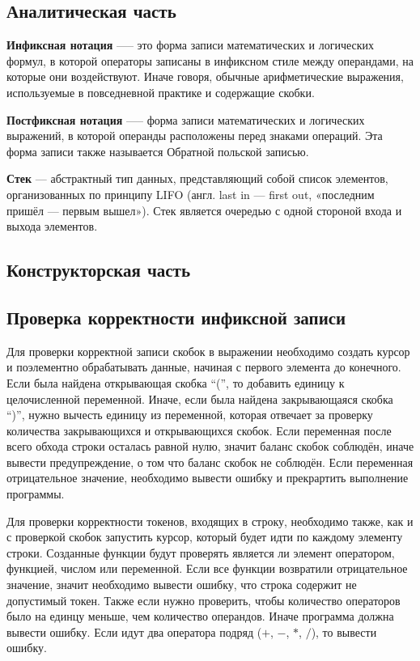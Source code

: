 \documentclass[12pt, a4paper]{article}
\begin{document}
\newpage
\begin{center}
   \section{Аналитическая часть} 
\end{center}

\textbf{Инфиксная нотация} —-- это форма записи математических и логических формул, в которой операторы записаны в инфиксном стиле между операндами, на которые они воздействуют. Иначе говоря, обычные арифметические выражения, используемые в повседневной практике и содержащие скобки.

\textbf{Постфиксная нотация} —-- форма записи математических и логических выражений, в которой операнды расположены перед знаками операций. Эта форма записи также называется Обратной польской записью. 

\textbf{Стек}\cite{book} --- абстрактный тип данных, представляющий собой список элементов, организованных по принципу LIFO (англ. last in — first out, «последним пришёл — первым вышел»). Стек является очередью с одной стороной входа и выхода элементов. 

\newpage
\begin{center}
    \section{Конструкторская часть}
\end{center}
\subsection{Проверка корректности инфиксной записи}
Для проверки корректной записи скобок в выражении необходимо создать курсор и поэлементно обрабатывать данные, начиная с первого элемента до конечного. Если была найдена открывающая скобка ``('', то добавить единицу к целочисленной переменной. Иначе, если была найдена закрывающаяся скобка ``)'', нужно вычесть единицу из переменной, которая отвечает за проверку количества закрывающихся и открывающихся скобок. Если переменная после всего обхода строки осталась равной нулю, значит баланс скобок соблюдён, иначе вывести предупреждение, о том что баланс скобок не соблюдён. Если переменная отрицательное значение, необходимо вывести ошибку и прекрартить выполнение программы. 

Для проверки корректности токенов, входящих в строку, необходимо также, как и с проверкой скобок запустить курсор, который будет идти по каждому элементу строки. Созданные функции будут проверять является ли элемент оператором, функцией, числом или переменной. Если все функции возвратили отрицательное значение, значит необходимо вывести ошибку, что строка содержит не допустимый токен. Также если нужно проверить, чтобы количество операторов было на единцу меньше, чем количество операндов. Иначе программа должна вывести ошибку. Если идут два оператора подряд ($+$, $-$, $*$, $/$), то вывести ошибку.
\end{document}
